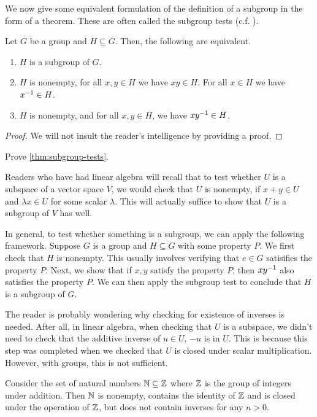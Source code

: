 \documentclass[./main.tex]{subfiles}
\begin{document}
We now give some equivalent formulation of the definition of a subgroup in the
form of a theorem. These are often called the subgroup tests (c.f. \cite{Gallian_2020}).
\begin{theorem}
\label{thm:subgroup-tests}
    Let $G$ be a group and $H \subseteq G$. Then, the following are equivalent.
    \begin{enumerate}
        \item $H$ is a subgroup of $G$.
        \item $H$ is nonempty, for all $x ,y \in H$ we have $xy \in H$. For all
        $x \in H$ we have $x ^{-1} \in H$.
        \item $H$ is nonempty, and for all $x,y \in H$, we have $xy^{-1} \in H$.
    \end{enumerate}
\end{theorem}
\begin{proof}
    We will not insult the reader's intelligence by providing a proof.
\end{proof}
\begin{exercise}
    Prove \cref{thm:subgroup-tests}.
\end{exercise}

Readers who have had linear algebra will recall that to test whether $U$ is a
subspace of a vector space $V$, we would check that $U$ is nonempty, if $x + y
\in U$ and $\lambda x \in U$ for some scalar $\lambda$. This will actually
suffice to show that $U$ is a subgroup of $V$ has well. 

In general, to test whether something is a subgroup, we can apply the following
framework. Suppose $G$ is a group and $H \subseteq G$ with some property $P$. We
first check that $H$ is nonempty. This usually involves verifying that $e \in G$
satisifies the property $P$. Next, we show that if $x, y$ satisfy the property
$P$, then $xy^{-1}$ also satisfies the property $P$. We can then apply the
subgroup test to conclude that $H$ is a subgroup of $G$. 

The reader is probably wondering why checking for existence of inverses is
needed. After all, in linear algebra, when checking that $U$ is a subspace, we
didn't need to check that the additive inverse of $u \in U$, $-u$ is in $U$.
This is because this step was completed when we checked that $U$ is closed under
scalar multiplication. However, with groups, this is not sufficient.

\begin{example}
Consider the set of natural numbers $\mathbb{N} \subseteq \mathbb{Z}$ where $\mathbb{Z}$ is
the group of integers under addition. Then $\mathbb{N}$ is nonempty, contains the
identity of $\mathbb{Z}$ and is closed under the operation of $\mathbb{Z}$, but does not
contain inverses for any $n > 0$.
\end{example}
\end{document}
